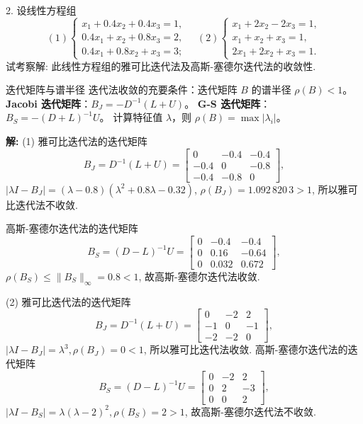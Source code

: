 \documentclass[a4paper,11pt]{ctexart}
\begin{document}
2. 设线性方程组
\[
(1) \begin{cases}
x_1 + 0.4x_2 + 0.4x_3 = 1, \\
0.4x_1 + x_2 + 0.8x_3 = 2, \\
0.4x_1 + 0.8x_2 + x_3 = 3;
\end{cases}
\quad
(2) \begin{cases}
x_1 + 2x_2 - 2x_3 = 1, \\
x_1 + x_2 + x_3 = 1, \\
2x_1 + 2x_2 + x_3 = 1.
\end{cases}
\]
试考察解: 此线性方程组的雅可比迭代法及高斯-塞德尔迭代法的收敛性.

\begin{theorybox}{迭代矩阵与谱半径}
迭代法收敛的充要条件：迭代矩阵 $B$ 的谱半径 $\rho(B) < 1$。
\textbf{Jacobi 迭代矩阵}：$B_J = -D^{-1}(L+U)$。
\textbf{G-S 迭代矩阵}：$B_S = -(D+L)^{-1}U$。
计算特征值 $\lambda$，则 $\rho(B) = \max|\lambda_i|$。
\end{theorybox}

\textbf{解: } (1) 雅可比迭代法的迭代矩阵
\[
B_J = D^{-1}(L+U) = \begin{bmatrix}
0 & -0.4 & -0.4 \\
-0.4 & 0 & -0.8 \\
-0.4 & -0.8 & 0
\end{bmatrix},
\]
$|\lambda I - B_J| = (\lambda - 0.8)(\lambda^2 + 0.8\lambda - 0.32)$,
$\rho(B_J) = 1.092\,820\,3 > 1$, 所以雅可比迭代法不收敛.

高斯-塞德尔迭代法的迭代矩阵
\[
B_S = (D-L)^{-1}U = \begin{bmatrix}
0 & -0.4 & -0.4 \\
0 & 0.16 & -0.64 \\
0 & 0.032 & 0.672
\end{bmatrix},
\]
$\rho(B_S) \leqslant \|B_S\|_\infty = 0.8 < 1$, 故高斯-塞德尔迭代法收敛.

(2) 雅可比迭代法的迭代矩阵
\[
B_J = D^{-1}(L+U) = \begin{bmatrix}
0 & -2 & 2 \\
-1 & 0 & -1 \\
-2 & -2 & 0
\end{bmatrix},
\]
$|\lambda I - B_J| = \lambda^3, \rho(B_J) = 0 < 1$, 所以雅可比迭代法收敛.
高斯-塞德尔迭代法的迭代矩阵
\[
B_S = (D-L)^{-1}U = \begin{bmatrix}
0 & -2 & 2 \\
0 & 2 & -3 \\
0 & 0 & 2
\end{bmatrix},
\]
$|\lambda I - B_S| = \lambda(\lambda-2)^2, \rho(B_S) = 2 > 1$, 故高斯-塞德尔迭代法不收敛.
\end{document}
